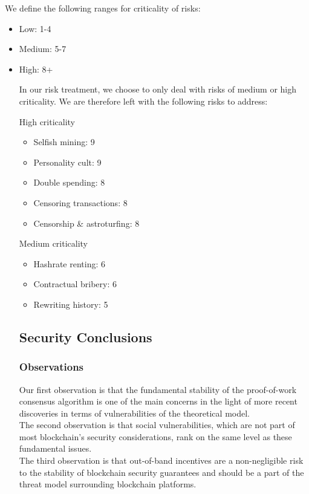 \documentclass[11pt,a4paper]{article}
\begin{document}
We define the following ranges for criticality of risks:
\begin{itemize}
  \item Low: 1-4
  \item Medium: 5-7
  \item High: 8+
\begin{itemize}

In our risk treatment, we choose to only deal with risks of medium or high criticality. We are therefore left with the following risks to address:

High criticality
\begin{itemize}
  \item Selfish mining: 9
  \item Personality cult: 9
  \item Double spending: 8
  \item Censoring transactions: 8
  \item Censorship \& astroturfing: 8
\end{itemize}

Medium criticality
\begin{itemize}
  \item Hashrate renting: 6
  \item Contractual bribery: 6
  \item Rewriting history: 5
\end{itemize}

\subsection{Security Conclusions}

\subsubsection{Observations}

Our first observation is that the fundamental stability of the proof-of-work consensus algorithm is one of the main concerns in the light of more recent discoveries in terms of vulnerabilities of the theoretical model.\\

The second observation is that social vulnerabilities, which are not part of most blockchain's security considerations, rank on the same level as these fundamental issues.\\

The third observation is that out-of-band incentives are a non-negligible risk to the stability of blockchain security guarantees and should be a part of the threat model surrounding blockchain platforms.\\


\end{itemize}
\end{itemize}
\end{document}
